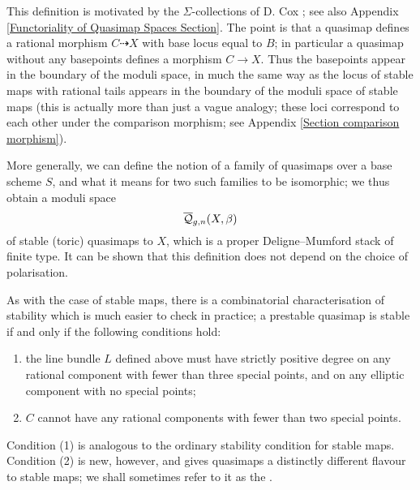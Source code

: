 \begin{remark} This definition is motivated by the $\Sigma$-collections of D. Cox \cite{CoxFunctor}; see also Appendix \ref{Functoriality of Quasimap Spaces Section}. The point is that a quasimap defines a rational morphism $C \dashrightarrow X$ with base locus equal to $B$; in particular a quasimap without any basepoints defines a morphism $C \to X$. Thus the basepoints appear in the boundary of the moduli space, in much the same way as the locus of stable maps with rational tails appears in the boundary of the moduli space of stable maps (this is actually more than just a vague analogy; these loci correspond to each other under the comparison morphism; see Appendix \ref{Section comparison morphism}). \end{remark}

More generally, we can define the notion of a family of quasimaps over a base scheme $S$, and what it means for two such families to be isomorphic; we thus obtain a moduli space
\begin{equation*} \overline{\mathcal Q}_{g,n}(X,\beta) \end{equation*}
of stable (toric) quasimaps to $X$, which is a proper Deligne--Mumford stack of finite type. It can be shown that this definition does not depend on the choice of polarisation.


As with the case of stable maps, there is a combinatorial characterisation of stability which is much easier to check in practice; a prestable quasimap is stable if and only if the following conditions hold:
\begin{enumerate}
\item the line bundle $L$ defined above must have strictly positive degree on any rational component with fewer than three special points, and on any elliptic component with no special points;
\item $C$ cannot have any rational components with fewer than two special points.
\end{enumerate}
Condition (1) is analogous to the ordinary stability condition for stable maps. Condition (2) is new, however, and gives quasimaps a distinctly different flavour to stable maps; we shall sometimes refer to it as the .

